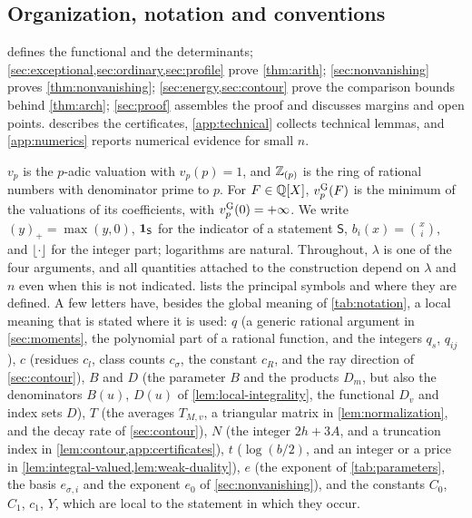 \subsection{Organization, notation and conventions}\label{sec:conventions}
 defines the functional and the determinants; \cref{sec:exceptional,sec:ordinary,sec:profile} prove \cref{thm:arith}; \cref{sec:nonvanishing} proves \cref{thm:nonvanishing}; \cref{sec:energy,sec:contour} prove the comparison bounds behind \cref{thm:arch}; \cref{sec:proof} assembles the proof and discusses margins and open points.  describes the certificates, \cref{app:technical} collects technical lemmas, and \cref{app:numerics} reports numerical evidence for small $n$.

$v_p$ is the $p$-adic valuation with $v_p(p)=1$, and $\mathbb{Z}_{(p)}$ is the ring of rational numbers with denominator prime to $p$. For $F\in\mathbb{Q}[X]$, $v^{\mathrm{G}}_{p}(F)$ is the minimum of the valuations of its coefficients, with $v^{\mathrm{G}}_{p}(0)=+\infty$. We write $(y)_+=\max(y,0)$, $\mathbf{1}_{\mathsf{S}}$ for the indicator of a statement $\mathsf S$, $b_i(x)=\binom xi$, and $\lfloor\cdot\rfloor$ for the integer part; logarithms are natural. Throughout, $\lambda$ is one of the four arguments, and all quantities attached to the construction depend on $\lambda$ and $n$ even when this is not indicated.  lists the principal symbols and where they are defined. A few letters have, besides the global meaning of \cref{tab:notation}, a local meaning that is stated where it is used: $q$ (a generic rational argument in \cref{sec:moments}, the polynomial part of a rational function, and the integers $q_s$, $q_{ij}$), $c$ (residues $c_l$, class counts $c_\sigma$, the constant $c_R$, and the ray direction of \cref{sec:contour}), $B$ and $D$ (the parameter $B$ and the products $D_m$, but also the denominators $B(u)$, $D(u)$ of \cref{lem:local-integrality}, the functional $D_v$ and index sets $D$), $T$ (the averages $T_{M,v}$, a triangular matrix in \cref{lem:normalization}, and the decay rate of \cref{sec:contour}), $N$ (the integer $2h+3A$, and a truncation index in \cref{lem:contour,app:certificates}), $t$ ($\log(b/2)$, and an integer or a price in \cref{lem:integral-valued,lem:weak-duality}), $e$ (the exponent of \cref{tab:parameters}, the basis $e_{\sigma,i}$ and the exponent $e_0$ of \cref{sec:nonvanishing}), and the constants $C_0$, $C_1$, $c_1$, $Y$, which are local to the statement in which they occur.

